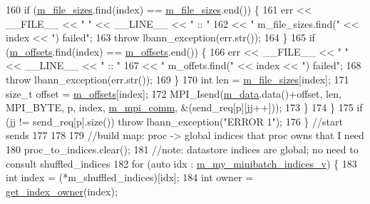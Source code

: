 \begin{DoxyCode}
160         \textcolor{keywordflow}{if} (\hyperlink{classlbann_1_1data__store__image_a1903176a4b305fd42617ea1cb6d997ae}{m\_file\_sizes}.find(index) == \hyperlink{classlbann_1_1data__store__image_a1903176a4b305fd42617ea1cb6d997ae}{m\_file\_sizes}.end()) \{
161           err << \_\_FILE\_\_ << \textcolor{stringliteral}{" "} << \_\_LINE\_\_ << \textcolor{stringliteral}{" :: "}
162               << \textcolor{stringliteral}{" m\_file\_sizes.find("} << index << \textcolor{stringliteral}{") failed"};
163           \textcolor{keywordflow}{throw} lbann\_exception(err.str());
164         \}
165         \textcolor{keywordflow}{if} (\hyperlink{classlbann_1_1data__store__image_ae5a9ba5fb1bf4d3147743012b8099038}{m\_offsets}.find(index) == \hyperlink{classlbann_1_1data__store__image_ae5a9ba5fb1bf4d3147743012b8099038}{m\_offsets}.end()) \{
166           err << \_\_FILE\_\_ << \textcolor{stringliteral}{" "} << \_\_LINE\_\_ << \textcolor{stringliteral}{" :: "}
167               << \textcolor{stringliteral}{" m\_offets.find("} << index << \textcolor{stringliteral}{") failed"};
168           \textcolor{keywordflow}{throw} lbann\_exception(err.str());
169         \}
170         \textcolor{keywordtype}{int} len = \hyperlink{classlbann_1_1data__store__image_a1903176a4b305fd42617ea1cb6d997ae}{m\_file\_sizes}[index];
171         \textcolor{keywordtype}{size\_t} offset = \hyperlink{classlbann_1_1data__store__image_ae5a9ba5fb1bf4d3147743012b8099038}{m\_offsets}[index];
172         MPI\_Isend(\hyperlink{classlbann_1_1data__store__image_a10e9aa0c240785bc0a961f24e87a1c16}{m\_data}.data()+offset, len, MPI\_BYTE, p, index, 
      \hyperlink{classlbann_1_1generic__data__store_ae2d2d61d5d766a7f525eedcb05e0dbf6}{m\_mpi\_comm}, &(send\_req[p][jj++]));
173       \}
174     \}
175     \textcolor{keywordflow}{if} (jj != send\_req[p].size()) \textcolor{keywordflow}{throw} lbann\_exception(\textcolor{stringliteral}{"ERROR 1"});
176   \} \textcolor{comment}{//start sends}
177 
178 
179   \textcolor{comment}{//build map: proc -> global indices that proc owns that I need}
180   proc\_to\_indices.clear();
181   \textcolor{comment}{//note: datastore indices are global; no need to consult shuffled\_indices}
182   \textcolor{keywordflow}{for} (\textcolor{keyword}{auto} idx : \hyperlink{classlbann_1_1generic__data__store_a41f7fec1f1f3d6568a5765be7a6784eb}{m\_my\_minibatch\_indices\_v}) \{
183     \textcolor{keywordtype}{int} index = (*m\_shuffled\_indices)[idx];
184     \textcolor{keywordtype}{int} owner = \hyperlink{classlbann_1_1generic__data__store_ad0de5ac2cdcf3f692acb252a019a2aed}{get\_index\_owner}(index);

\end{DoxyCode}
